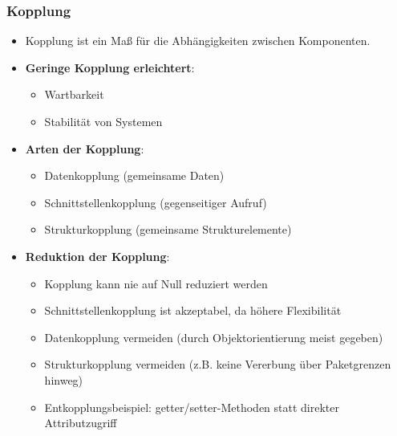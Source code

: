 \documentclass[11pt, a4paper]{article}
\begin{document}
\subsubsection{Kopplung}
\begin{itemize}
    \item Kopplung ist ein Maß für die Abhängigkeiten zwischen Komponenten.
    \item \textbf{Geringe Kopplung erleichtert}:
    \begin{itemize}
        \item Wartbarkeit
        \item Stabilität von Systemen
    \end{itemize}
    \item \textbf{Arten der Kopplung}:
    \begin{itemize}
        \item Datenkopplung (gemeinsame Daten)
        \item Schnittstellenkopplung (gegenseitiger Aufruf)
        \item Strukturkopplung (gemeinsame Strukturelemente)
    \end{itemize}
    \item \textbf{Reduktion der Kopplung}:
    \begin{itemize}
        \item Kopplung kann nie auf Null reduziert werden
        \item Schnittstellenkopplung ist akzeptabel, da höhere Flexibilität
        \item Datenkopplung vermeiden (durch Objektorientierung meist gegeben)
        \item Strukturkopplung vermeiden (z.B. keine Vererbung über Paketgrenzen hinweg)
        \item Entkopplungsbeispiel: getter/setter-Methoden statt direkter Attributzugriff
    \end{itemize}
\end{itemize}
\end{document}
